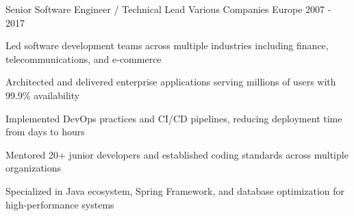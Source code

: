 \begin{cventries}
{\begin{cvitems}
        \end{cvitems}
    }
    \cventry
    {Senior Software Engineer / Technical Lead} %
    {Various Companies} %
    {Europe} %
    {2007 - 2017} %
    {
        \begin{cvitems} %
            \item{Led software development teams across multiple industries including finance, telecommunications, and e-commerce}
            \item{Architected and delivered enterprise applications serving millions of users with 99.9\% availability}
            \item{Implemented DevOps practices and CI/CD pipelines, reducing deployment time from days to hours}
            \item{Mentored 20+ junior developers and established coding standards across multiple organizations}
            \item{Specialized in Java ecosystem, Spring Framework, and database optimization for high-performance systems}
        \end{cvitems}
    }
\end{cventries}
